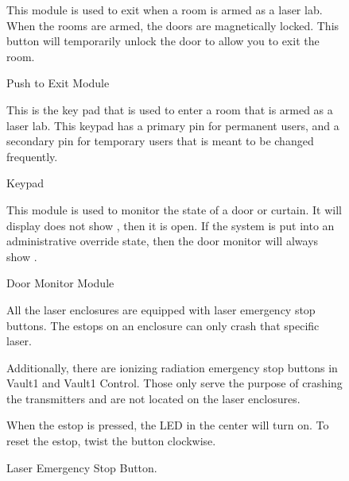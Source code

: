 \documentclass[letterpaper,10pt,english]{sphinxmanual}
\begin{document}
\begin{figure}[htbp]
\centering
\capstart

\noindent{}
\caption{ Push to Exit Module}\label{\detokenize{user_documentation/Hutch-1_laser:id6}}
\begin{sphinxlegend}
\sphinxAtStartPar
This module is used to exit when a room is armed as a laser lab.
When the rooms are armed, the doors are magnetically locked.
This button will temporarily unlock the door to allow you to exit the room.
\end{sphinxlegend}
\end{figure}

\begin{figure}[htbp]
\centering
\capstart

\noindent{}
\caption{ Keypad}\label{\detokenize{user_documentation/Hutch-1_laser:id7}}
\begin{sphinxlegend}
\sphinxAtStartPar
This is the key pad that is used to enter a room that is armed as a laser lab.
This keypad has a primary pin for permanent users, and a secondary pin for temporary users that is meant to be changed frequently.
\end{sphinxlegend}
\end{figure}

\begin{figure}[htbp]
\centering
\capstart

\noindent{}
\caption{ Door Monitor Module}\label{\detokenize{user_documentation/Hutch-1_laser:id8}}
\begin{sphinxlegend}
\sphinxAtStartPar
This module is used to monitor the state of a door or curtain.
It will display does not show , then it is open.
If the system is put into an administrative override state, then the door monitor will always show .
\end{sphinxlegend}
\end{figure}

\begin{figure}[htbp]
\centering
\capstart

\noindent{}
\caption{ Laser Emergency Stop Button.}\label{\detokenize{user_documentation/Hutch-1_laser:id9}}
\begin{sphinxlegend}
\sphinxAtStartPar
All the laser enclosures are equipped with laser emergency stop buttons.
The e\sphinxhyphen{}stops on an enclosure can only crash that specific laser.

\sphinxAtStartPar
Additionally, there are ionizing radiation emergency stop buttons in Vault\sphinxhyphen{}1 and Vault\sphinxhyphen{}1 Control.
Those only serve the purpose of crashing the transmitters and are not located on the laser enclosures.

\sphinxAtStartPar
When the e\sphinxhyphen{}stop is pressed, the LED in the center will turn on.
To reset the e\sphinxhyphen{}stop, twist the button clockwise.
\end{sphinxlegend}
\end{figure}
\end{document}
